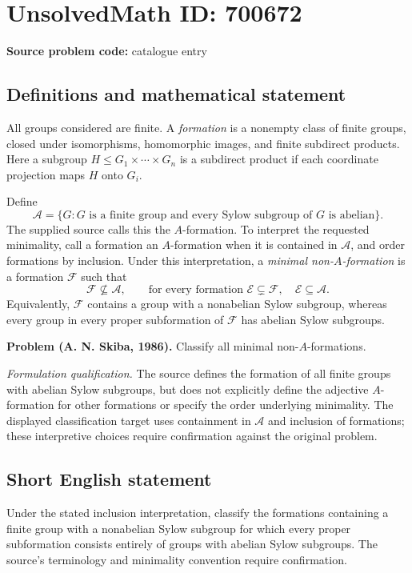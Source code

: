 \documentclass[11pt]{article}
\begin{document}
\section*{UnsolvedMath ID: 700672}
\textbf{Source problem code:} catalogue entry
\subsection{Definitions and mathematical statement}
All groups considered are finite. A \emph{formation} is a nonempty class of finite groups, closed under isomorphisms, homomorphic images, and finite subdirect products. Here a subgroup \(H\leq G_1\times\cdots\times G_n\) is a subdirect product if each coordinate projection maps \(H\) onto \(G_i\).

Define
\[
\mathcal A=\{G: G\text{ is a finite group and every Sylow subgroup of }G\text{ is abelian}\}.
\]
The supplied source calls this the \(A\)-formation. To interpret the requested minimality, call a formation an \(A\)-formation when it is contained in \(\mathcal A\), and order formations by inclusion. Under this interpretation, a \emph{minimal non-\(A\)-formation} is a formation \(\mathcal F\) such that
\[
\mathcal F\nsubseteq\mathcal A,
\qquad
\text{for every formation }\mathcal E\subsetneq\mathcal F,
\quad \mathcal E\subseteq\mathcal A.
\]
Equivalently, \(\mathcal F\) contains a group with a nonabelian Sylow subgroup, whereas every group in every proper subformation of \(\mathcal F\) has abelian Sylow subgroups.

\textbf{Problem (A. N. Skiba, 1986).} Classify all minimal non-\(A\)-formations.

\textit{Formulation qualification.} The source defines the formation of all finite groups with abelian Sylow subgroups, but does not explicitly define the adjective \(A\)-formation for other formations or specify the order underlying minimality. The displayed classification target uses containment in \(\mathcal A\) and inclusion of formations; these interpretive choices require confirmation against the original problem.
\subsection{Short English statement}
Under the stated inclusion interpretation, classify the formations containing a finite group with a nonabelian Sylow subgroup for which every proper subformation consists entirely of groups with abelian Sylow subgroups. The source's terminology and minimality convention require confirmation.
\end{document}
